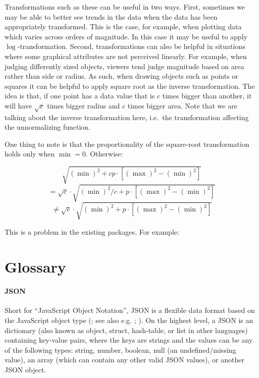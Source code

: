 \documentclass[
]{book}
\theoremstyle{definition}
\theoremstyle{definition}
\theoremstyle{definition}
\theoremstyle{definition}
\theoremstyle{remark}
\begin{document}
Transformations such as these can be useful in two ways. First, sometimes we may be able to better see trends in the data when the data has been appropriately transformed. This is the case, for example, when plotting data which varies across orders of magnitude. In this case it may be useful to apply \(\log\)-transformation. Second, transformations can also be helpful in situations where some graphical attributes are not perceived linearly. For example, when judging differently sized objects, viewers tend judge magnitude based on area rather than side or radius. As such, when drawing objects such as points or squares it can be helpful to apply square root as the inverse transformation. The idea is that, if one point has a data value that is \(c\) times bigger than another, it will have \(\sqrt{c}\) times bigger radius and \(c\) times bigger area. Note that we are talking about the inverse transformation here, i.e.~the transformation affecting the unnormalizing function.

One thing to note is that the proportionality of the square-root transformation holds only when \(\min = 0\). Otherwise:

\[\sqrt{(\min)^2 + cp \cdot [(\max)^2 - (\min)^2]}\]
\[= \sqrt{c} \cdot \sqrt{(\min)^2/c + p \cdot [(\max)^2 - (\min)^2]}\]
\[\neq \sqrt{c} \cdot \sqrt{(\min)^2 + p \cdot [(\max)^2 - (\min)^2]}\]

This is a problem in the existing packages. For example:

\section{}\label{section}

\chapter{Glossary}\label{glossary}

\subsubsection{JSON}\label{JSON}

Short for ``JavaScript Object Notation'', JSON is a flexible data format based on the JavaScript object type (; see also e.g. ; ). On the highest level, a JSON is an dictionary (also known as object, struct, hash-table, or list in other languages) containing key-value pairs, where the keys are strings and the values can be any of the following types: string, number, boolean, null (an undefined/missing value), an array (which can contain any other valid JSON values), or another JSON object.
\end{document}
